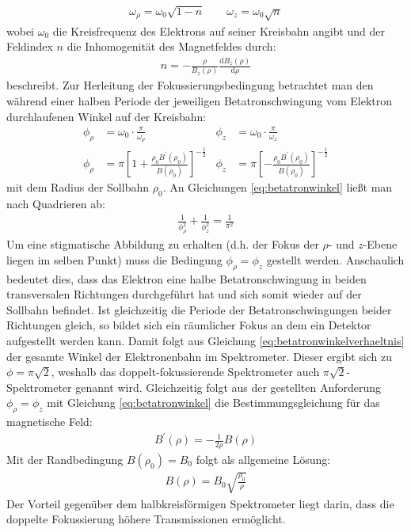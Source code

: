 \documentclass[11pt, a4paper]{article}
\numberwithin{equation}{section}
\begin{document}
\begin{align}
	\omega_\rho = \omega_0 \sqrt{1-n} \qquad \omega_z = \omega_0 \sqrt{n}
\end{align}
wobei $\omega_0$ die Kreisfrequenz des Elektrons auf seiner Kreisbahn angibt und der Feldindex $n$ die Inhomogenität des Magnetfeldes durch:
\begin{align}
	n = - \frac{\rho}{B_z(\rho)} \frac{\mathrm{d} B_z(\rho)}{\mathrm{d} \rho}
\end{align}
beschreibt.
Zur Herleitung der Fokussierungsbedingung betrachtet man den während einer halben Periode der jeweiligen Betatronschwingung vom Elektron durchlaufenen Winkel auf der Kreisbahn:
\begin{align}
	\phi_\rho &= \omega_0 \cdot \frac{\pi}{\omega_\rho} & \phi_z &= \omega_0 \cdot \frac{\pi}{\omega_z}\\
	\phi_\rho &= \pi \left[ 1+ \frac{\rho_0 B^\prime(\rho_0)}{B(\rho_0)} \right]^{-\frac{1}{2}} & \phi_z &= \pi \left[ -\frac{\rho_0 B^\prime(\rho_0)}{B(\rho_0)} \right]^{-\frac{1}{2}} \label{eq:betatronwinkel}
\end{align}
mit dem Radius der Sollbahn $\rho_0$.
An Gleichungen \eqref{eq:betatronwinkel} ließt man nach Quadrieren ab:
\begin{align}
	\frac{1}{\phi_\rho^2} + \frac{1}{\phi_z^2} = \frac{1}{\pi^2} \label{eq:betatronwinkelverhaeltnis}
\end{align}
Um eine stigmatische Abbildung zu erhalten (d.h. der Fokus der $\rho$- und $z$-Ebene liegen im selben Punkt) muss die Bedingung $\phi_\rho = \phi_z$ gestellt werden.
Anschaulich bedeutet dies, dass das Elektron eine halbe Betatronschwingung in beiden transversalen Richtungen durchgeführt hat und sich somit wieder auf der Sollbahn befindet.
Ist gleichzeitig die Periode der Betatronschwingungen beider Richtungen gleich, so bildet sich ein räumlicher Fokus an dem ein Detektor aufgestellt werden kann.
Damit folgt aus Gleichung \eqref{eq:betatronwinkelverhaeltnis} der gesamte Winkel der Elektronenbahn im Spektrometer.
Dieser ergibt sich zu $\phi = \pi \sqrt{2}$, weshalb das doppelt-fokussierende Spektrometer auch $\pi \sqrt{2}$-Spektrometer genannt wird.
Gleichzeitig folgt aus der gestellten Anforderung $\phi_\rho = \phi_z$ mit Gleichung \eqref{eq:betatronwinkel} die Bestimmungsgleichung für das magnetische Feld:
\begin{align}
	B^\prime(\rho) = - \frac{1}{2 \rho} B(\rho)
\end{align}
Mit der Randbedingung $B(\rho_0) = B_0$ folgt als allgemeine Lösung:
\begin{align}
	B(\rho) = B_0 \sqrt{\frac{\rho_0}{\rho}}
\end{align}
Der Vorteil gegenüber dem halbkreisförmigen Spektrometer liegt darin, dass die doppelte Fokussierung höhere Transmissionen ermöglicht.
\end{document}
